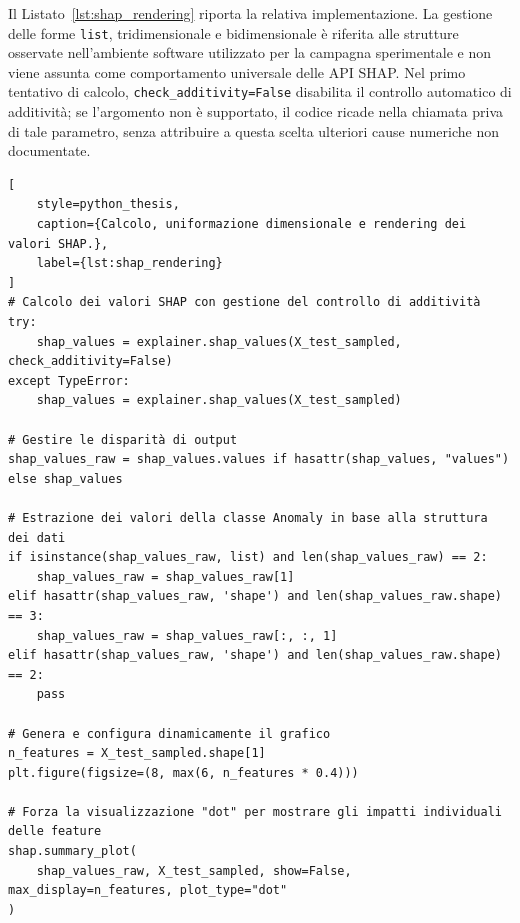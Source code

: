 Il Listato~\ref{lst:shap_rendering} riporta la relativa implementazione.
La gestione delle forme \texttt{list}, tridimensionale e bidimensionale è riferita alle strutture osservate nell'ambiente software utilizzato per la campagna sperimentale e non viene assunta come comportamento universale delle API SHAP. Nel primo tentativo di calcolo, \texttt{check\_additivity=False} disabilita il controllo automatico di additività; se l'argomento non è supportato, il codice ricade nella chiamata priva di tale parametro, senza attribuire a questa scelta ulteriori cause numeriche non documentate.

\begin{lstlisting}[
    style=python_thesis,
    caption={Calcolo, uniformazione dimensionale e rendering dei valori SHAP.},
    label={lst:shap_rendering}
]
# Calcolo dei valori SHAP con gestione del controllo di additività
try:
    shap_values = explainer.shap_values(X_test_sampled, check_additivity=False)
except TypeError:
    shap_values = explainer.shap_values(X_test_sampled)

# Gestire le disparità di output
shap_values_raw = shap_values.values if hasattr(shap_values, "values") else shap_values

# Estrazione dei valori della classe Anomaly in base alla struttura dei dati
if isinstance(shap_values_raw, list) and len(shap_values_raw) == 2:
    shap_values_raw = shap_values_raw[1]
elif hasattr(shap_values_raw, 'shape') and len(shap_values_raw.shape) == 3:
    shap_values_raw = shap_values_raw[:, :, 1]
elif hasattr(shap_values_raw, 'shape') and len(shap_values_raw.shape) == 2:
    pass

# Genera e configura dinamicamente il grafico
n_features = X_test_sampled.shape[1]
plt.figure(figsize=(8, max(6, n_features * 0.4)))

# Forza la visualizzazione "dot" per mostrare gli impatti individuali delle feature
shap.summary_plot(
    shap_values_raw, X_test_sampled, show=False, max_display=n_features, plot_type="dot"
)
\end{lstlisting}